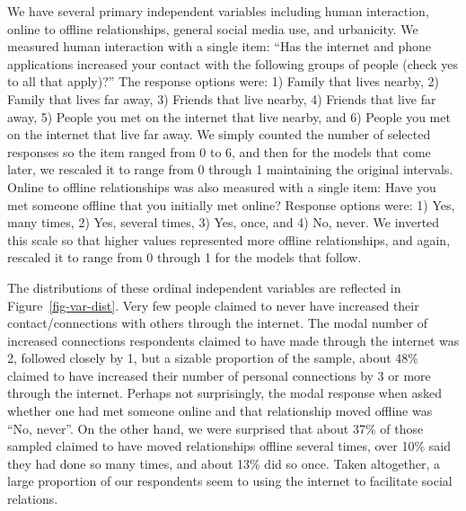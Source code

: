 \documentclass[
  letterpaper,
  DIV=11,
  numbers=noendperiod]{scrartcl}
\begin{document}
We have several primary independent variables including human
interaction, online to offline relationships, general social media use,
and urbanicity. We measured human interaction with a single item: ``Has
the internet and phone applications increased your contact with the
following groups of people (check yes to all that apply)?'' The response
options were: 1) Family that lives nearby, 2) Family that lives far
away, 3) Friends that live nearby, 4) Friends that live far away, 5)
People you met on the internet that live nearby, and 6) People you met
on the internet that live far away. We simply counted the number of
selected responses so the item ranged from 0 to 6, and then for the
models that come later, we rescaled it to range from 0 through 1
maintaining the original intervals. Online to offline relationships was
also measured with a single item: Have you met someone offline that you
initially met online? Response options were: 1) Yes, many times, 2) Yes,
several times, 3) Yes, once, and 4) No, never. We inverted this scale so
that higher values represented more offline relationships, and again,
rescaled it to range from 0 through 1 for the models that follow.

The distributions of these ordinal independent variables are reflected
in Figure~\ref{fig-var-dist}. Very few people claimed to never have
increased their contact/connections with others through the internet.
The modal number of increased connections respondents claimed to have
made through the internet was 2, followed closely by 1, but a sizable
proportion of the sample, about 48\% claimed to have increased their
number of personal connections by 3 or more through the internet.
Perhaps not surprisingly, the modal response when asked whether one had
met someone online and that relationship moved offline was ``No,
never''. On the other hand, we were surprised that about 37\% of those
sampled claimed to have moved relationships offline several times, over
10\% said they had done so many times, and about 13\% did so once. Taken
altogether, a large proportion of our respondents seem to using the
internet to facilitate social relations.
\end{document}
